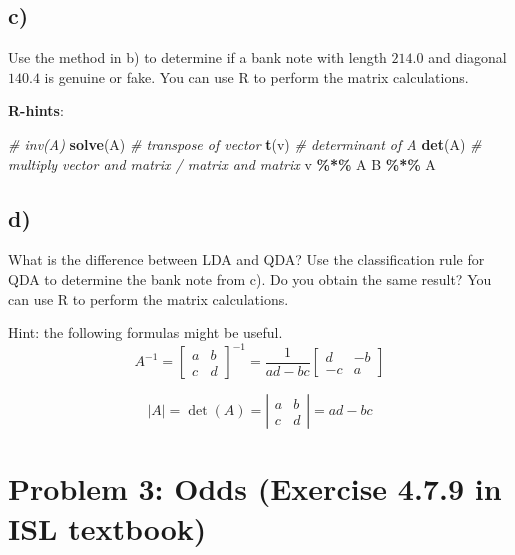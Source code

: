 \documentclass[
]{article}
\newenvironment{Shaded}{\begin{snugshade}}{\end{snugshade}}
\newcommand{\CommentTok}[1]{\textcolor[rgb]{0.56,0.35,0.01}{\textit{#1}}}
\newcommand{\FunctionTok}[1]{\textcolor[rgb]{0.13,0.29,0.53}{\textbf{#1}}}
\newcommand{\NormalTok}[1]{#1}
\newcommand{\SpecialCharTok}[1]{\textcolor[rgb]{0.81,0.36,0.00}{\textbf{#1}}}
\begin{document}
\subsection{c)}\label{c-1}

Use the method in b) to determine if a bank note with length \(214.0\)
and diagonal \(140.4\) is genuine or fake. You can use R to perform the
matrix calculations.

\textbf{R-hints}:

\begin{Shaded}
\begin{Highlighting}[]
\CommentTok{\# inv(A)}
\FunctionTok{solve}\NormalTok{(A)}
\CommentTok{\# transpose of vector}
\FunctionTok{t}\NormalTok{(v)}
\CommentTok{\# determinant of A}
\FunctionTok{det}\NormalTok{(A)}
\CommentTok{\# multiply vector and matrix / matrix and matrix}
\NormalTok{v }\SpecialCharTok{\%*\%}\NormalTok{ A}
\NormalTok{B }\SpecialCharTok{\%*\%}\NormalTok{ A}
\end{Highlighting}
\end{Shaded}

\subsection{d)}\label{d}

What is the difference between LDA and QDA? Use the classification rule
for QDA to determine the bank note from c). Do you obtain the same
result? You can use R to perform the matrix calculations.

Hint: the following formulas might be useful. \[
A^{-1} = \left[
\begin{array}{cc} a & b \\ c & d \end{array} 
\right]^{-1} = \frac{1}{ad-bc}
\left[
\begin{array}{cc} d & -b \\ -c & a \end{array} 
\right]
\]

\[
|A| = \det(A) = \left|\begin{array}{cc} a & b \\ c & d \end{array}\right| = ad - bc
\]

\section{Problem 3: Odds (Exercise 4.7.9 in ISL
textbook)}\label{problem-3-odds-exercise-4.7.9-in-isl-textbook}
\end{document}
